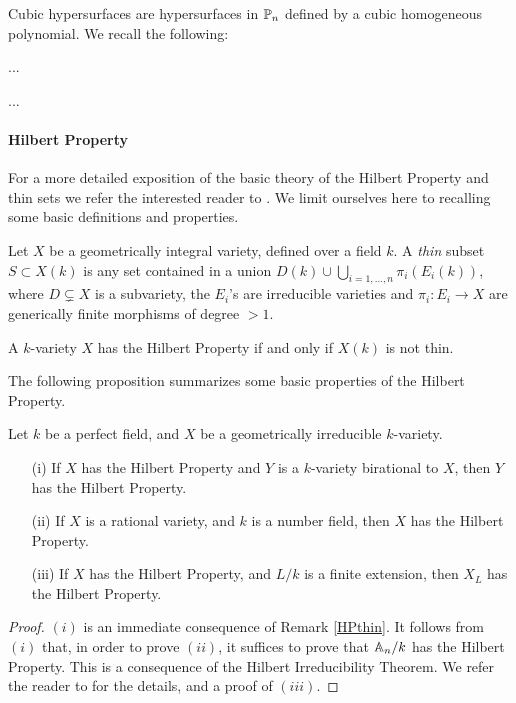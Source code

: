\documentclass[a4paper,12pt]{article}
\begin{document}
Cubic hypersurfaces are hypersurfaces in $\P_n$ defined by a cubic homogeneous polynomial. We recall the following:

\begin{theorem}\label{Thm:unirationalcubics}
	...
\end{theorem}

...

\paragraph{Hilbert Property}

For a more detailed exposition of the basic theory of the Hilbert Property and thin sets we refer the interested reader to \cite[Ch. 3]{Serre}. We limit ourselves here to recalling some basic definitions and properties.


\begin{definition}\label{Def:thin}
	Let $X$ be a geometrically integral variety, defined over a field $k$. A \textit{thin} subset $S \subset X(k)$ is any set contained in a union $D(k)\cup \bigcup_{i=1,\dots,n} \pi_i(E_i(k))$, where $D \subsetneq X$ is a subvariety, the $E_i$'s are irreducible varieties and $\pi_i:E_i \rightarrow X$ are generically finite morphisms of degree $>1$.
\end{definition}


\begin{remark}\label{HPthin}
	A $k$-variety $X$ has the Hilbert Property if and only if $X(k)$ is not thin.
\end{remark}

The following proposition summarizes some basic properties of the Hilbert Property.
\begin{proposition}\label{HP}
	Let $k$ be a perfect field, and $X$ be a geometrically irreducible $k$-variety.
	\begin{itemize}
		\item[(i)] If $X$ has the Hilbert Property and $Y$ is a $k$-variety birational to $X$, then $Y$ has the Hilbert Property. 
		\item[(ii)] If $X$ is a rational variety, and $k$ is a number field, then $X$ has the Hilbert Property.
		\item[(iii)] If $X$ has the Hilbert Property, and $L/k$ is a finite extension, then $X_L$ has the Hilbert Property.
	\end{itemize}
\end{proposition}
\begin{proof}
	$(i)$ is an immediate consequence of Remark \ref{HPthin}. It follows from $(i)$ that, in order to prove $(ii)$, it suffices to prove that $\A_n/k$ has the Hilbert Property. This is a consequence of the Hilbert Irreducibility Theorem. We refer the reader to \cite[Ch. 3]{Serre} for the details, and a proof of $(iii)$.
\end{proof}
\end{document}
